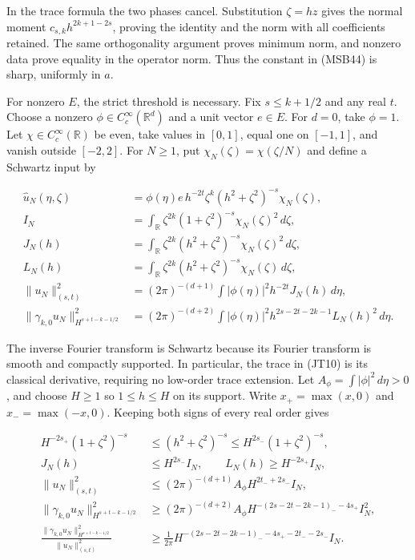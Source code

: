 \documentclass[
  11pt,
]{article}
\begin{document}
In the trace formula the two phases cancel. Substitution \(\zeta=hz\)
gives the normal moment \(c_{s,k}h^{2k+1-2s}\), proving the identity and
the norm with all coefficients retained. The same orthogonality argument
proves minimum norm, and nonzero data prove equality in the operator
norm. Thus the constant in (MSB44) is sharp, uniformly in \(a\).

For nonzero \(E\), the strict threshold is necessary. Fix
\(s\leq k+1/2\) and any real \(t\). Choose a nonzero
\(\phi\in C_c^\infty(\mathbb R^d)\) and a unit vector \(e\in E\). For
\(d=0\), take \(\phi=1\). Let \(\chi\in C_c^\infty(\mathbb R)\) be even,
take values in \([0,1]\), equal one on \([-1,1]\), and vanish outside
\([-2,2]\). For \(N\geq1\), put \(\chi_N(\zeta)=\chi(\zeta/N)\) and
define a Schwartz input by

\[
 \begin{aligned}
 \widehat u_N(\eta,\zeta)
 &=\phi(\eta)e\,h^{-2t}\zeta^k
           (h^2+\zeta^2)^{-s}\chi_N(\zeta),\\
 I_N&=\int_{\mathbb R}\zeta^{2k}(1+\zeta^2)^{-s}
                              \chi_N(\zeta)^2\,d\zeta,\\
 J_N(h)&=\int_{\mathbb R}\zeta^{2k}(h^2+\zeta^2)^{-s}
                              \chi_N(\zeta)^2\,d\zeta,\\
 L_N(h)&=\int_{\mathbb R}\zeta^{2k}(h^2+\zeta^2)^{-s}
                              \chi_N(\zeta)\,d\zeta,\\
 \|u_N\|_{(s,t)}^2
 &=(2\pi)^{-(d+1)}\int|\phi(\eta)|^2h^{-2t}J_N(h)\,d\eta,\\
 \|\gamma_{k,0}u_N\|_{H^{s+t-k-1/2}}^2
 &=(2\pi)^{-(d+2)}\int|\phi(\eta)|^2
              h^{2s-2t-2k-1}L_N(h)^2\,d\eta.
 \end{aligned}
 \tag{JT10}
\]

The inverse Fourier transform is Schwartz because its Fourier transform
is smooth and compactly supported. In particular, the trace in (JT10) is
its classical derivative, requiring no low-order trace extension. Let
\(A_\phi=\int|\phi|^2\,d\eta>0\), and choose \(H\geq1\) so
\(1\leq h\leq H\) on its support. Write \(x_+=\max(x,0)\) and
\(x_-=\max(-x,0)\). Keeping both signs of every real order gives

\[
 \begin{aligned}
 H^{-2s_+}(1+\zeta^2)^{-s}
 &\leq(h^2+\zeta^2)^{-s}
       \leq H^{2s_-}(1+\zeta^2)^{-s},\\
 J_N(h)&\leq H^{2s_-}I_N,\qquad
 L_N(h)\geq H^{-2s_+}I_N,\\
 \|u_N\|_{(s,t)}^2
 &\leq(2\pi)^{-(d+1)}A_\phi
                         H^{2t_-+2s_-}I_N,\\
 \|\gamma_{k,0}u_N\|_{H^{s+t-k-1/2}}^2
 &\geq(2\pi)^{-(d+2)}A_\phi
             H^{-(2s-2t-2k-1)_--4s_+}I_N^2,\\
 \frac{\|\gamma_{k,0}u_N\|_{H^{s+t-k-1/2}}^2}
      {\|u_N\|_{(s,t)}^2}
 &\geq\frac{1}{2\pi}
 H^{-(2s-2t-2k-1)_--4s_+-2t_--2s_-}I_N.
 \end{aligned}
 \tag{JT11}
\]
\end{document}
